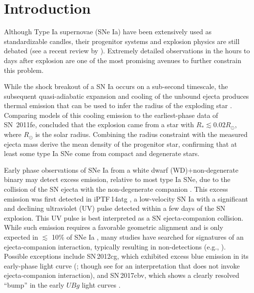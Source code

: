 \documentclass[twocolumn]{aastex61}
\newcommand{\sr}{R_\odot}
\newcommand{\ycao}[1]{{\color{red} ycao: {#1}}}
\begin{document}

\section{Introduction}
\label{sec:intro}

Although Type Ia supernovae (SNe Ia) have been extensively used as
standardizable candles, their progenitor systems and explosion
physics are still debated (see a recent review by
\citealt{2014ARA&A..52..107M}). Extremely detailed
observations in the hours to days after explosion are one of the most promising avenues to further
constrain this problem.

While the shock breakout of a SN Ia occurs on a sub-second timescale,
the subsequent quasi-adiabatic expansion and cooling of the unbound
ejecta produces thermal emission that can be used to infer the
radius of the exploding star
\citep{2010ApJ...708..598P,2011ApJ...728...63R}. Comparing models of
this cooling emission to the earliest-phase data of SN~2011fe,
\citet{2012ApJ...744L..17B} concluded that the explosion came from a 
star with $R_\ast \lesssim 0.02\sr$, where $\sr$ is the solar
radius. Combining the radius constraint with the measured ejecta 
mass \citeauthor{2012ApJ...744L..17B} derive the mean density of the 
progenitor star, confirming that at least some type Ia SNe come from 
compact and degenerate stars. 

Early phase observations of SNe Ia from a white dwarf (WD)$+$non-degenerate binary
may detect excess emission, relative to most type Ia SNe, due to the 
collision of the SN ejecta with the non-degenerate companion 
\citep{1973ApJ...186.1007W,2010ApJ...708.1025K}. This excess 
emission was first detected in iPTF\,14atg  \citep{2015Natur.521..328C}, a low-velocity SN Ia with a significant and declining ultraviolet (UV) pulse detected within a
few days of the SN explosion. This UV pulse is best interpreted as a
SN ejecta-companion collision. While such emission requires a 
favorable geometric alignment and is only expected in $\lesssim$ 
10\% of SNe Ia \citep{2010ApJ...708.1025K}, many studies have 
searched for signatures of an ejecta-companion interaction, 
typically resulting in non-detections 
(e.g., \citealt{2010ApJ...722.1691H,2011ApJ...741...20B,2012ApJ...744...38F,
  2012ApJ...744L..17B,2015Natur.521..332O,
  2013ApJ...778L..15Z,2015ApJ...799..106G,2016ApJ...826..144S,
  2015ApJS..221...22I}). Possible exceptions include SN\,2012cg, 
which exhibited excess blue emission in its early-phase light curve 
(\citealt{2016ApJ...820...92M}; though see 
\citealt{2016arXiv161007601S} for an interpretation that does not 
invoke ejecta-companion interaction), and SN\,2017cbv, which shows a clearly resolved ``bump'' in the early $UBg$ light curves \citep{2017arXiv170608990H}. 
\end{document}
